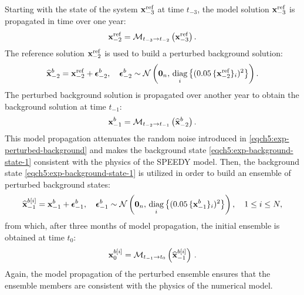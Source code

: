 \documentclass[12pt]{article}
\newcommand{\Nens}{N} \newcommand{\Nobs}{m} \newcommand{\Nstate}{n} \newcommand{\X}{{\bf X}} \newcommand{\x}{{\bf x}} \newcommand{\J}{\mathcal{J}} \newcommand{\lp}{\left (} \newcommand{\rp}{\right )} \newcommand{\lb}{\left [} \newcommand{\rb}{\right ]} \renewcommand{\ln}{\left \|} \newcommand{\rn}{\right \|}
\newcommand{\zero}{{\bf 0}}
\begin{document}
Starting with the state of the system  $\x^\textnormal{ref}_{-3}$ at time $t_{-3}$, the model solution $\x^\textnormal{ref}_{-3}$ is propagated in time over one year:
\begin{eqnarray*}
\x^\textnormal{ref}_{-2} = \M_{t_{-3} \rightarrow t_{-2}} \lp \x^\textnormal{ref}_{-3}\rp.
\end{eqnarray*}
The reference solution $\x^\textnormal{ref}_{-2}$ is used to build a perturbed background solution:
\begin{eqnarray}
\label{eqch5:exp-perturbed-background}
\displaystyle
\widehat{\x}^{b}_{-2} = \x^\textnormal{ref}_{-2} + \errobs^{b}_{-2}, \quad  \errobs^{b}_{-2} \sim \Nor \lp \zero_{\Nstate} ,\, \underset{i}{\textnormal{diag}} \left\{ (0.05\, \{\x^\textnormal{ref}_{-2}\}_i)^2 \right\} \rp.
\end{eqnarray}
The perturbed background solution is propagated over another year to obtain the background solution at time $t_{-1}$:
\begin{eqnarray}
\label{eqch5:exp-background-state-1}
\x^{b}_{-1} = \M_{t_{-2} \rightarrow t_{-1}} \lp \widehat{\x}^{b}_{-2}\rp.
\end{eqnarray}
This model propagation attenuates the random noise introduced in \eqref{eqch5:exp-perturbed-background} and makes the background state \eqref{eqch5:exp-background-state-1} consistent with the physics of the SPEEDY model. Then, the background state \eqref{eqch5:exp-background-state-1} is utilized in order to build an ensemble of perturbed background states:
\begin{eqnarray}
\label{eqch5:exp-perturbed-ensemble}
\displaystyle
\widehat{\x}^{b[i]}_{-1}  = \x^{b}_{-1} + \errobs^{b}_{-1},\quad \errobs^{b}_{-1} \sim \Nor \lp \zero_{\Nstate} ,\, \underset{i}{\textnormal{diag}} \left\{ (0.05\, \{\x^{b}_{-1}\}_i)^2 \right\} \rp,
\quad 1 \le i \le \Nens,
\end{eqnarray}
from which, after three months of model propagation, the initial ensemble is obtained at time $t_0$:
\begin{eqnarray*}
\x^{b[i]}_0 = \M_{t_{-1} \rightarrow t_0} \lp \widehat{\x}^{b[i]}_{-1}\rp \,.
\end{eqnarray*}
Again, the model propagation of the perturbed ensemble ensures that the ensemble members are consistent with the physics of the numerical model. 
\end{document}
